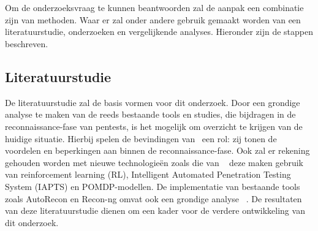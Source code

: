 
\chapter{}%
\label{ch:methodologie}


Om de onderzoeksvraag te kunnen beantwoorden zal de aanpak een combinatie zijn van methoden. Waar er zal onder andere gebruik
gemaakt worden van een literatuurstudie, onderzoeken en vergelijkende analyses. Hieronder zijn de stappen beschreven.

\section{Literatuurstudie}

De literatuurstudie zal de basis vormen voor dit onderzoek. Door een grondige analyse te maken van de reeds bestaande tools en studies,
die bijdragen in de reconnaissance-fase van pentests, is het mogelijk om overzicht te krijgen van de huidige situatie.
Hierbij spelen de bevindingen van~\textcite{Shah,Kothia,otherShah2019} een rol: zij tonen de voordelen en beperkingen aan binnen de reconnaissance-fase.
Ook zal er rekening gehouden worden met nieuwe technologieën zoals die van ~\textcite{Ghanem,Hoang,Monero2025} deze maken gebruik van
reinforcement learning (RL), Intelligent Automated Penetration Testing System (IAPTS) en POMDP-modellen. De implementatie van bestaande
tools zoals AutoRecon en Recon-ng omvat ook een grondige analyse ~\autocite{Shebli}.
De resultaten van deze literatuurstudie dienen om een kader voor de verdere ontwikkeling van dit onderzoek.

